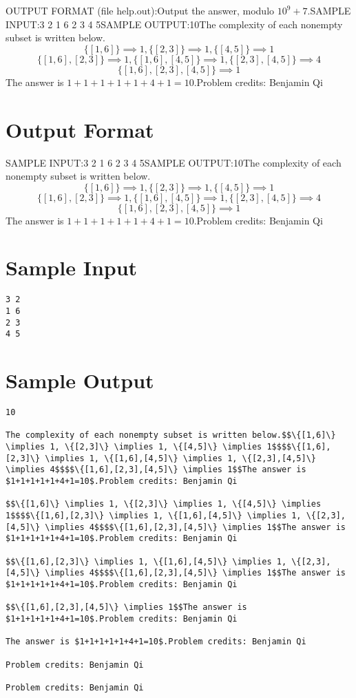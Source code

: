 \documentclass[12pt]{article}
\begin{document}
OUTPUT FORMAT (file help.out):Output the answer, modulo $10^9+7$.SAMPLE INPUT:3 2
1 6
2 3
4 5SAMPLE OUTPUT:10The complexity of each nonempty subset is written below.$$\{[1,6]\} \implies 1, \{[2,3]\} \implies 1, \{[4,5]\} \implies 1$$$$\{[1,6],[2,3]\} \implies 1, \{[1,6],[4,5]\} \implies 1, \{[2,3],[4,5]\} \implies 4$$$$\{[1,6],[2,3],[4,5]\} \implies 1$$The answer is $1+1+1+1+1+4+1=10$.Problem credits: Benjamin Qi

\section*{Output Format}
SAMPLE INPUT:3 2
1 6
2 3
4 5SAMPLE OUTPUT:10The complexity of each nonempty subset is written below.$$\{[1,6]\} \implies 1, \{[2,3]\} \implies 1, \{[4,5]\} \implies 1$$$$\{[1,6],[2,3]\} \implies 1, \{[1,6],[4,5]\} \implies 1, \{[2,3],[4,5]\} \implies 4$$$$\{[1,6],[2,3],[4,5]\} \implies 1$$The answer is $1+1+1+1+1+4+1=10$.Problem credits: Benjamin Qi

\section*{Sample Input}
\begin{verbatim}
3 2
1 6
2 3
4 5
\end{verbatim}

\section*{Sample Output}
\begin{verbatim}
10

The complexity of each nonempty subset is written below.$$\{[1,6]\} \implies 1, \{[2,3]\} \implies 1, \{[4,5]\} \implies 1$$$$\{[1,6],[2,3]\} \implies 1, \{[1,6],[4,5]\} \implies 1, \{[2,3],[4,5]\} \implies 4$$$$\{[1,6],[2,3],[4,5]\} \implies 1$$The answer is $1+1+1+1+1+4+1=10$.Problem credits: Benjamin Qi

$$\{[1,6]\} \implies 1, \{[2,3]\} \implies 1, \{[4,5]\} \implies 1$$$$\{[1,6],[2,3]\} \implies 1, \{[1,6],[4,5]\} \implies 1, \{[2,3],[4,5]\} \implies 4$$$$\{[1,6],[2,3],[4,5]\} \implies 1$$The answer is $1+1+1+1+1+4+1=10$.Problem credits: Benjamin Qi

$$\{[1,6],[2,3]\} \implies 1, \{[1,6],[4,5]\} \implies 1, \{[2,3],[4,5]\} \implies 4$$$$\{[1,6],[2,3],[4,5]\} \implies 1$$The answer is $1+1+1+1+1+4+1=10$.Problem credits: Benjamin Qi

$$\{[1,6],[2,3],[4,5]\} \implies 1$$The answer is $1+1+1+1+1+4+1=10$.Problem credits: Benjamin Qi

The answer is $1+1+1+1+1+4+1=10$.Problem credits: Benjamin Qi

Problem credits: Benjamin Qi

Problem credits: Benjamin Qi
\end{verbatim}
\end{document}

